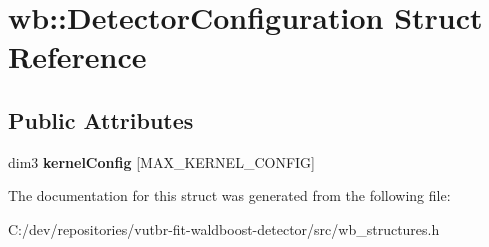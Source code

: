 \hypertarget{structwb_1_1_detector_configuration}{}\section{wb\+:\+:Detector\+Configuration Struct Reference}
\label{structwb_1_1_detector_configuration}
\subsection*{Public Attributes}
\begin{DoxyCompactItemize}
\item 
\hypertarget{structwb_1_1_detector_configuration_a6033351342193ac59ae11bdda16ecfca}{}dim3 {\bfseries kernel\+Config} \mbox{[}M\+A\+X\+\_\+\+K\+E\+R\+N\+E\+L\+\_\+\+C\+O\+N\+F\+I\+G\mbox{]}\label{structwb_1_1_detector_configuration_a6033351342193ac59ae11bdda16ecfca}

\end{DoxyCompactItemize}


The documentation for this struct was generated from the following file\+:\begin{DoxyCompactItemize}
\item 
C\+:/dev/repositories/vutbr-\/fit-\/waldboost-\/detector/src/wb\+\_\+structures.\+h\end{DoxyCompactItemize}
